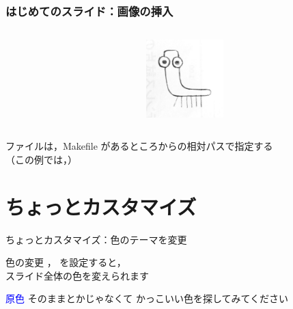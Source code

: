 \begin{frame}[fragile]
  \frametitle{はじめてのスライド：画像の挿入}
  \begin{columns}
    \begin{column}{0.67\textwidth}
      
    \end{column}
    \begin{column}{0.33\textwidth}
      \includegraphics[width = 3cm]{./fig/logo}
    \end{column}
  \end{columns}
    ファイルは，Makefile があるところからの相対パスで指定する\\
    （この例では，\hbox{}）  
\end{frame}

\section{ちょっとカスタマイズ}

{

\begin{frame}{ちょっとカスタマイズ：色のテーマを変更}
  \begin{block}{色の変更}
    ， を設定すると，\\
    スライド全体の色を変えられます
    
    \begin{itemize}
      \ngitem \textcolor{blue}{原色} そのままとかじゃなくて
      \okitem かっこいい色を探してみてください
    \end{itemize}
  \end{block}

\end{frame}
}

